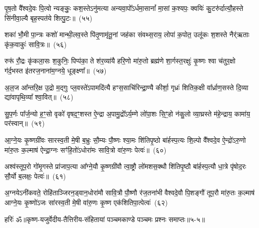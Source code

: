 {\anuvakamend[{}]}

पृ॒ष॒तो वै᳚श्वदे॒वः पि॒त्वो न्यङ्कुः॒ कश॒स्ते\-ऽनु॑मत्या अन्यवा॒पो᳚\-ऽर्धमा॒सानां᳚ मा॒सां क॒श्यपः॒ क्वयिः॑ कु॒टरु॑र्दात्यौ॒हस्ते सि॑नीवा॒ल्यै बृह॒स्पत॑ये शित्पु॒टः॥~(५५)\ip

{\anuvakamend[{}]}

शका॑ भौ॒मी पा॒न्त्रः कशो॑ मान्थी॒लव॒स्ते पि॑तृ॒णामृ॑तू॒नां जह॑का संवथ्स॒राय॒ लोपा॑ क॒पोत॒ उलू॑कः श॒शस्ते नैर्॑\mbox{}ऋताः कृ॑क॒वाकुः॑ सावि॒त्रः॥~(५६)\ip

{\anuvakamend[{बला॑य पुरुषमृ॒गः सौ॒री पृ॑ष॒तः शका॒ष्टाद॑शा॒ष्टाद॑श}]}%

रुरू॑ रौ॒द्रः कृ॑कला॒सः श॒कुनिः॒ पिप्प॑का॒ ते श॑र॒व्या॑यै हरि॒णो मा॑रु॒तो ब्रह्म॑णे शा॒र्गस्त॒रक्षुः॑ कृ॒ष्णः श्वा च॑तुर॒क्षो ग॑र्द॒भस्त इ॑तरज॒नाना॑म॒ग्नये॒ धूङ्क्ष्णा᳚॥~(५७)\ip

{\anuvakamend[{रुरु॑र्विꣳश॒तिः}]}%

अ॒ल॒ज आ᳚न्तरि॒क्ष उ॒द्रो म॒द्गुः प्ल॒वस्ते॑\-ऽपामदि॑त्यै हꣳस॒साचि॑रिन्द्रा॒ण्यै कीर्\mbox{}शा॒ गृध्रः॑ शितिक॒क्षी वा᳚र्ध्राण॒सस्ते दि॒व्या द्या॑वापृथि॒व्या᳚ श्वा॒वित्॥~(५८)\ip

{\anuvakamend[{}]}

सु॒प॒र्णः पा᳚र्ज॒न्यो ह॒ꣳ॒सो वृको॑ वृषद॒ꣳ॒शस्त ऐ॒न्द्रा अ॒पामु॒द्रो᳚\-ऽर्य॒म्णे लो॑पा॒शः सि॒ꣳ॒हो न॑कु॒लो व्या॒घ्रस्ते म॑हे॒न्द्राय॒ कामा॑य॒ पर॑स्वान्॥~(५९)\ip

{\anuvakamend[{अ॒ल॒जः सु॑प॒र्णो᳚\-ऽष्टाद॑शाष्टा॒द॑श}]}%

आ॒ग्ने॒यः कृ॒ष्णग्री॑वः सारस्व॒ती मे॒षी ब॒भ्रुः सौ॒म्यः पौ॒ष्णः श्या॒मः शि॑तिपृ॒ष्ठो बा॑र्\mbox{}हस्प॒त्यः शि॒ल्पो वै᳚श्वदे॒व ऐ॒न्द्रो॑\-ऽरु॒णो मा॑रु॒तः क॒ल्माष॑ ऐन्द्रा॒ग्नः सꣳ॑हि॒तो॑\-ऽधोरा॑मः सावि॒त्रो वा॑रु॒णः पेत्वः॑॥~(६०)\ip

{\anuvakamend[{आ॒ग्ने॒यो द्वाविꣳ॑शतिः}]}%

अश्व॑स्तूप॒रो गो॑मृ॒गस्ते प्रा॑जाप॒त्या आ᳚ग्ने॒यौ कृ॒ष्णग्री॑वौ त्वा॒ष्ट्रौ लो॑मशस॒क्थौ शि॑तिपृ॒ष्ठौ बा॑र्\mbox{}हस्प॒त्यौ धा॒त्रे पृ॑षोद॒रः सौ॒र्यो ब॒लक्षः॒ पेत्वः॑॥~(६१)\ip

{\anuvakamend[{अश्वः॒ षोड॑श}]}%

अ॒ग्नये\-ऽनी॑कवते॒ रोहि॑ताञ्जिरन॒ड्वान॒धोरा॑मौ सावि॒त्रौ पौ॒ष्णौ र॑ज॒तना॑भी वैश्वदे॒वौ पि॒शङ्गौ॑ तूप॒रौ मा॑रु॒तः क॒ल्माष॑ आग्ने॒यः कृ॒ष्णो॑\-ऽजः सा॑रस्व॒ती मे॒षी वा॑रु॒णः कृ॒ष्ण एक॑शितिपा॒त्पेत्वः॑~(६२)\ip

{\anuvakamend[{अ॒ग्नयो\-ऽनी॑कवते॒ द्वाविꣳ॑शतिः}]}%

{हरिः॑ ॐ}{॥कृष्ण-यजुर्वेदीय-तैत्तिरीय-संहितायां पञ्चमकाण्डे पञ्चमः प्रश्नः समाप्तः॥५-५॥}


